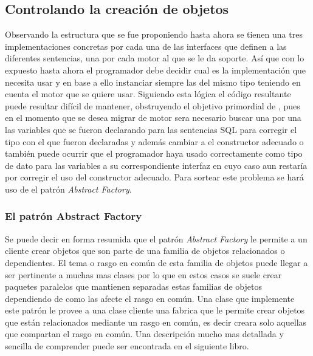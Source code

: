 \subsection{Controlando la creación de objetos}
Observando la estructura que se fue proponiendo hasta ahora se tienen una tres implementaciones concretas por cada una de las interfaces que definen a las diferentes sentencias, una por cada motor al que se le da soporte. Así que con lo expuesto hasta ahora el programador debe decidir cual es la implementación que necesita usar y en base a ello instanciar siempre las del mismo tipo teniendo en cuenta el motor que se quiere usar. Siguiendo esta lógica el código resultante puede resultar difícil de mantener, obstruyendo el objetivo primordial de \jj,  pues en el momento que se desea migrar de motor sera necesario buscar una por una las variables que se fueron declarando para las sentencias SQL para corregir el tipo con el que fueron declaradas y además cambiar a el constructor adecuado o también puede ocurrir que el programador haya usado correctamente como tipo de dato para las variables a su correspondiente interfaz en cuyo caso aun restaría por corregir el uso del constructor adecuado. Para sortear este problema se hará uso de el patrón \textit{Abstract Factory}.
%
\subsubsection{El patrón Abstract Factory}
Se puede decir en forma resumida que el patrón \textit{Abstract Factory} le permite a un cliente crear objetos que son parte de una familia de objetos relacionados o dependientes. El tema o rasgo en común de esta familia de objetos puede llegar a ser pertinente a muchas mas clases por lo que en estos casos se suele crear paquetes paralelos que mantienen separadas estas familias de objetos dependiendo de como las afecte el rasgo en común. Una clase que implemente este patrón le provee a una clase cliente una fabrica que le permite crear objetos que están relacionados mediante un rasgo en común, es decir creara solo aquellas que compartan el rasgo en común. Una descripción mucho mas detallada y sencilla de comprender puede ser encontrada en el siguiente libro\cite{Metsker:2002:DPJ}. 

